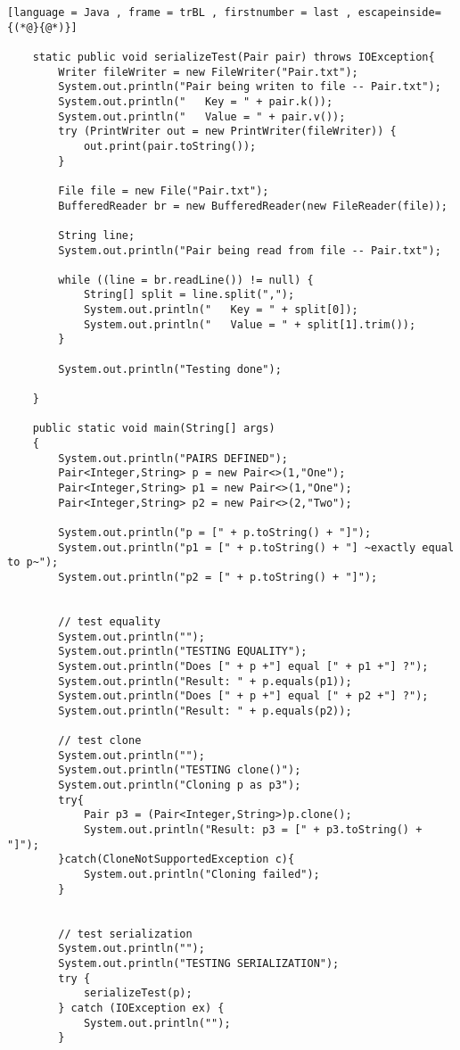 \begin{enumerate}[label=(\alph*),align=left, wide, labelwidth=!, labelindent=0pt]
\begin{lstlisting}[language = Java , frame = trBL , firstnumber = last , escapeinside={(*@}{@*)}]
    
    static public void serializeTest(Pair pair) throws IOException{
        Writer fileWriter = new FileWriter("Pair.txt");
        System.out.println("Pair being writen to file -- Pair.txt");
        System.out.println("   Key = " + pair.k());
        System.out.println("   Value = " + pair.v());
        try (PrintWriter out = new PrintWriter(fileWriter)) {
            out.print(pair.toString());
        }
        
        File file = new File("Pair.txt"); 
        BufferedReader br = new BufferedReader(new FileReader(file));
  
        String line;
        System.out.println("Pair being read from file -- Pair.txt");

        while ((line = br.readLine()) != null) {
            String[] split = line.split(",");
            System.out.println("   Key = " + split[0]);
            System.out.println("   Value = " + split[1].trim());
        }
        
        System.out.println("Testing done");
            
    }
    
    public static void main(String[] args)
    {
        System.out.println("PAIRS DEFINED");
        Pair<Integer,String> p = new Pair<>(1,"One");
        Pair<Integer,String> p1 = new Pair<>(1,"One");
        Pair<Integer,String> p2 = new Pair<>(2,"Two");
        
        System.out.println("p = [" + p.toString() + "]");
        System.out.println("p1 = [" + p.toString() + "] ~exactly equal to p~");
        System.out.println("p2 = [" + p.toString() + "]");

        
        // test equality
        System.out.println("");
        System.out.println("TESTING EQUALITY");
        System.out.println("Does [" + p +"] equal [" + p1 +"] ?");
        System.out.println("Result: " + p.equals(p1));
        System.out.println("Does [" + p +"] equal [" + p2 +"] ?");
        System.out.println("Result: " + p.equals(p2));
        
        // test clone
        System.out.println("");
        System.out.println("TESTING clone()");
        System.out.println("Cloning p as p3");
        try{
            Pair p3 = (Pair<Integer,String>)p.clone();
            System.out.println("Result: p3 = [" + p3.toString() + "]");
        }catch(CloneNotSupportedException c){
            System.out.println("Cloning failed");
        }  
        
        
        // test serialization
        System.out.println("");
        System.out.println("TESTING SERIALIZATION");
        try {
            serializeTest(p);
        } catch (IOException ex) {
            System.out.println("");
        }
        

\end{lstlisting}
\end{enumerate}
